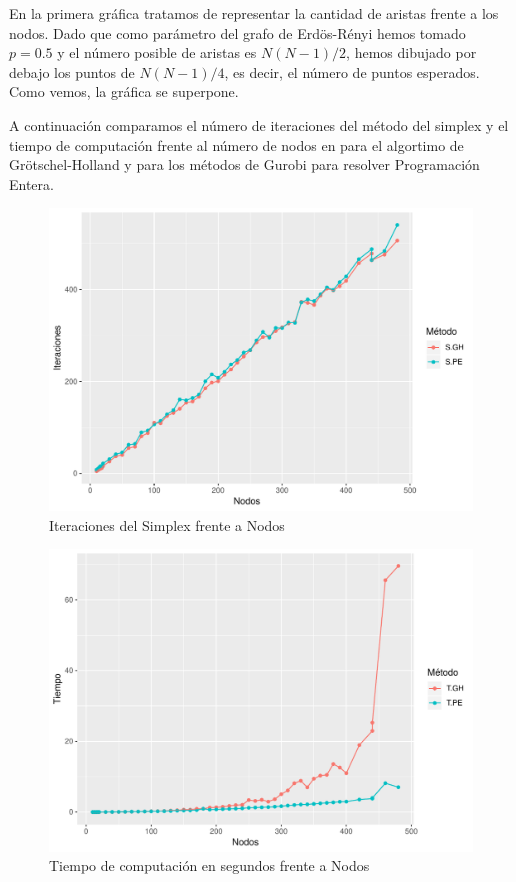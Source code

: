 \documentclass[twoside,a4paper,openright,12pt]{book}
\begin{document}
En la primera gráfica tratamos de representar la cantidad de aristas frente a los nodos. Dado que como parámetro del grafo de Erdös-Rényi hemos tomado $p=0.5$ y el número posible de aristas es $N(N-1)/2$, hemos dibujado por debajo los puntos de $N(N-1)/4$, es decir, el número de puntos esperados. Como vemos, la gráfica se superpone.

A continuación comparamos el número de iteraciones del método del simplex y el tiempo de computación frente al número de nodos en para el algortimo de Grötschel-Holland y para los métodos de Gurobi para resolver Programación Entera.
\newpage
\begin{figure}[h!]
\centering
\includegraphics[scale=0.65]{plot2}
\caption{Iteraciones del Simplex frente a Nodos}
\end{figure}

\begin{figure}[h!]
\centering
\includegraphics[scale=0.65]{plot3}
\caption{Tiempo de computación en segundos frente a Nodos}
\end{figure}
\end{document}
